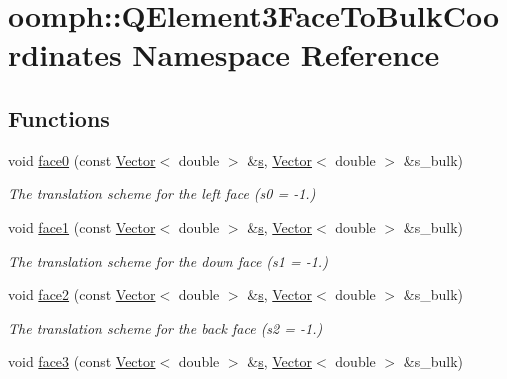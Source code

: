 \hypertarget{namespaceoomph_1_1QElement3FaceToBulkCoordinates}{}\section{oomph\+:\+:Q\+Element3\+Face\+To\+Bulk\+Coordinates Namespace Reference}
\label{namespaceoomph_1_1QElement3FaceToBulkCoordinates}
\subsection*{Functions}
\begin{DoxyCompactItemize}
\item 
void \hyperlink{namespaceoomph_1_1QElement3FaceToBulkCoordinates_a578392accb58b015e051ac3fd65e9539}{face0} (const \hyperlink{classoomph_1_1Vector}{Vector}$<$ double $>$ \&\hyperlink{cfortran_8h_ab7123126e4885ef647dd9c6e3807a21c}{s}, \hyperlink{classoomph_1_1Vector}{Vector}$<$ double $>$ \&s\+\_\+bulk)
\begin{DoxyCompactList}\small\item\em The translation scheme for the left face (s0 = -\/1.) \end{DoxyCompactList}\item 
void \hyperlink{namespaceoomph_1_1QElement3FaceToBulkCoordinates_a1d59d5d45707d18a3317634a4b29c3a5}{face1} (const \hyperlink{classoomph_1_1Vector}{Vector}$<$ double $>$ \&\hyperlink{cfortran_8h_ab7123126e4885ef647dd9c6e3807a21c}{s}, \hyperlink{classoomph_1_1Vector}{Vector}$<$ double $>$ \&s\+\_\+bulk)
\begin{DoxyCompactList}\small\item\em The translation scheme for the down face (s1 = -\/1.) \end{DoxyCompactList}\item 
void \hyperlink{namespaceoomph_1_1QElement3FaceToBulkCoordinates_a55c787680b0d4526ecbba1f7f8c5b05b}{face2} (const \hyperlink{classoomph_1_1Vector}{Vector}$<$ double $>$ \&\hyperlink{cfortran_8h_ab7123126e4885ef647dd9c6e3807a21c}{s}, \hyperlink{classoomph_1_1Vector}{Vector}$<$ double $>$ \&s\+\_\+bulk)
\begin{DoxyCompactList}\small\item\em The translation scheme for the back face (s2 = -\/1.) \end{DoxyCompactList}\item 
void \hyperlink{namespaceoomph_1_1QElement3FaceToBulkCoordinates_a98113be325f672274d18cb10d5de2389}{face3} (const \hyperlink{classoomph_1_1Vector}{Vector}$<$ double $>$ \&\hyperlink{cfortran_8h_ab7123126e4885ef647dd9c6e3807a21c}{s}, \hyperlink{classoomph_1_1Vector}{Vector}$<$ double $>$ \&s\+\_\+bulk)

\end{DoxyCompactItemize}
